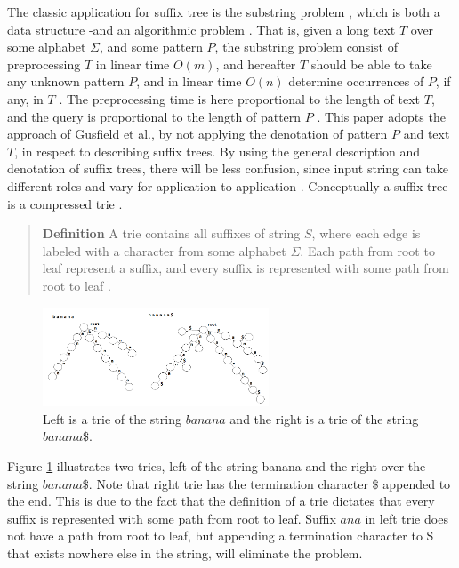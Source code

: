 \documentclass[12pt]{article} %
\begin{document}
The classic application for suffix tree is the substring problem \cite{gusfield, Kunihiko}, which is both a data structure -and an algorithmic problem \cite{mit}. That is, given a long text $T$ over some alphabet $\Sigma$, and some pattern $P$, the substring problem consist of preprocessing $T$ in linear time $O(m)$, and hereafter  $T$ should be able to take any unknown pattern $P$, and in linear time $O(n)$ determine occurrences of $ P$, if any, in $T$ \cite{gusfield}. The preprocessing time is here proportional to the length of text $T$, and the query is proportional to the length of pattern $P$ \cite{gusfield}. 
\newline
This paper adopts the approach of Gusfield et al., by not applying the denotation of pattern $P$ and text $T$, in respect to describing suffix trees. By using the general description and denotation of suffix trees, there will be less confusion, since input string can take different roles and vary for application to application \cite{gusfield}.
\newline
\newline
Conceptually a suffix tree is a compressed trie \cite{mit}.  
\begin{quote}
\textbf{Definition}    A trie contains all suffixes of string $S$, where each edge is labeled with a character from some alphabet $\Sigma$. Each path from root to leaf represent a suffix, and every suffix is represented with some path from root to leaf \cite{mit,Kunihiko}.
\end{quote}
\begin{figure}[h]
    \centering
    \includegraphics[width=0.6\textwidth]{trie}
    \captionsetup{width=0.8\textwidth}
    \caption{Left is a trie of the string $banana$ and the right is a trie of the string $banana\$$.}
    \label{fig:trie}
\end{figure}
\newline
Figure \ref{fig:trie} illustrates two tries, left of the string banana and the right over the string $banana\$$. Note that right trie has the termination character $\$$ appended to the end. This is due to the fact that the definition of a trie dictates that every suffix is represented with some path from root to leaf. Suffix $ana$ in left trie does not have a path from root to leaf, but appending a termination character to S that exists nowhere else in the string, will eliminate the problem.
\end{document}
